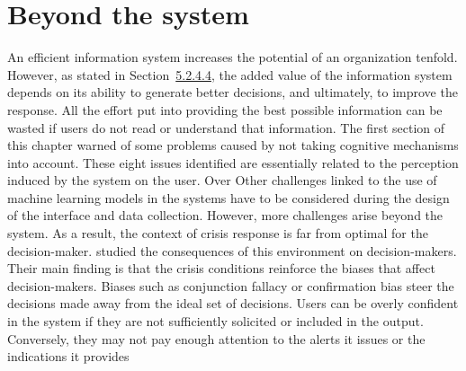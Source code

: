 \section{Beyond the system}
An efficient information system increases the potential of an organization tenfold.
However, as stated in Section~\hyperref[sec:information-distribution]{5.2.4.4}, the added value of the information system depends on its ability to generate better decisions, and ultimately, to improve the response.
All the effort put into providing the best possible information can be wasted if users do not read or understand that information.
The first section of this chapter warned of some problems caused by not taking cognitive mechanisms into account.
These eight issues identified are essentially related to the perception induced by the system on the user.
Over
Other challenges linked to the use of machine learning models in the systems have to be considered during the design of the interface and data collection.
However, more challenges arise beyond the system.
As a result, the context of crisis response is far from optimal for the decision-maker.
\textcite{comesCognitiveBiasesHumanitarian2016} studied the consequences of this environment on decision-makers.
Their main finding is that the crisis conditions reinforce the biases that affect decision-makers.
Biases such as conjunction fallacy or confirmation bias steer the decisions made away from the ideal set of decisions.
Users can be overly confident in the system if they are not sufficiently solicited or included in the output.
Conversely, they may not pay enough attention to the alerts it issues or the indications it provides
